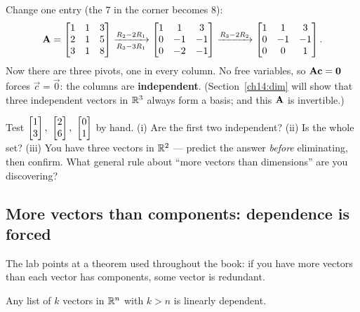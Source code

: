 \begin{example}
\label{ch14:ex-indep3}
Change one entry (the $7$ in the corner becomes $8$):
\[
  \mathbf{A}=\begin{bmatrix} 1 & 1 & 3\\ 2 & 1 & 5\\ 3 & 1 & 8\end{bmatrix}
  \xrightarrow[R_3-3R_1]{R_2-2R_1}
  \begin{bmatrix} 1 & 1 & 3\\ 0 & -1 & -1\\ 0 & -2 & -1\end{bmatrix}
  \xrightarrow{R_3-2R_2}
  \begin{bmatrix} 1 & 1 & 3\\ 0 & -1 & -1\\ 0 & 0 & 1\end{bmatrix}.
\]
Now there are three pivots, one in every column. No free variables, so
$\mathbf{A}\mathbf{c}=\mathbf{0}$ forces $\vec{c}=\vec{0}$: the columns are
\textbf{independent}. (Section~\ref{ch14:dim} will show that three independent
vectors in $\mathbb{R}^3$ always form a basis; and this $\mathbf{A}$ is invertible.)
\end{example}

\begin{labbox}
Test $\colvec{1\\3},\ \colvec{2\\6},\ \colvec{0\\1}$ by hand. (i) Are the first
two independent? (ii) Is the whole set? (iii) You have three vectors in $\mathbb{R}^2$ ---
predict the answer \emph{before} eliminating, then confirm. What general rule
about ``more vectors than dimensions'' are you discovering?
\end{labbox}

\subsection*{More vectors than components: dependence is forced}

The lab points at a theorem used throughout the book: if you have more vectors
than each vector has components, some vector is redundant.

\begin{theorem}
\label{ch14:thm-toomany}
Any list of $k$ vectors in $\mathbb{R}^n$ with $k > n$ is linearly dependent.
\end{theorem}

